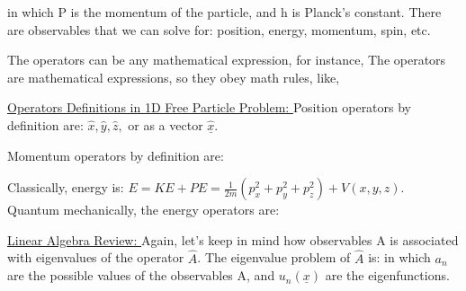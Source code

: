 \documentclass{school-22.101-notes}
\date{September 12, 2011}
\begin{document}
\maketitle

in which P is the momentum of the particle, and h is Planck's constant. There are observables that we can solve for: position, energy, momentum, spin, etc. 


The operators can be any mathematical expression, for instance,
The operators are mathematical expressions, so they obey math rules, like,

\uline{Operators Definitions in 1D Free Particle Problem: } Position operators by definition are: $\hat{x}, \hat{y}, \hat{z},$ or as a vector $\hat{\underline{x}}$. 

Momentum operators by definition are:

Classically, energy is: $E = KE + PE = \frac{1}{2m} (p_x^2 + p_y^2 + p_z^2) + V(x,y,z)$. Quantum mechanically, the energy operators are:

\uline{Linear Algebra Review: }
Again, let's keep in mind how observables A is associated with eigenvalues of the operator $\hat{A}$. The eigenvalue problem of $\hat{A}$ is:
in which $a_n$ are the possible values of the observables A, and $u_n(\underline{x})$ are the eigenfunctions. 
\end{document}
